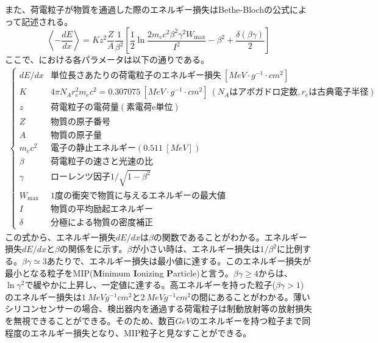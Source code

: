 また、荷電粒子が物質を通過した際のエネルギー損失はBethe-Blochの公式によって記述される。
\begin{equation}
  \label{eq:bethe}
  \left\langle -\frac{dE}{dx} \right\rangle = Kz^2\frac{Z}{A}\frac{1}{\beta^2}\left[ \frac{1}{2}\ln\frac{2m_e c^2 \beta^2 \gamma^2 W_\mathrm{max}}{I^2} -\beta^2 + \frac{\delta (\beta\gamma)}{2} \right]
\end{equation}
ここで、における各パラメータは以下の通りである。
\begin{align*}
  \begin{cases}
    dE/dx & \mathrm{単位長さあたりの荷電粒子のエネルギー損失}\ [\si{MeV\cdot g^{-1}\cdot cm^2}]\\
    K & 4\pi N_A r^2_e m_e c^2 = 0.307075\ [\si{MeV\cdot g^{-1}\cdot cm^2}]\ (N_A\mathrm{はアボガドロ定数}, r_e\mathrm{は古典電子半径})\\
    z & \mathrm{荷電粒子の電荷量(素電荷e単位)}\\
    Z & \mathrm{物質の原子番号}\\
    A & \mathrm{物質の原子量}\\
    m_e c^2 & \mathrm{電子の静止エネルギー}(0.511\ [\si{MeV}]) \\
    \beta & \mathrm{荷電粒子の速さと光速の比}\\
    \gamma & \mathrm{ローレンツ因子} 1/\sqrt{1-\beta^2} \\
    W_\mathrm{max} & \mathrm{1度の衝突で物質に与えるエネルギーの最大値} \\
    I & \mathrm{物質の平均励起エネルギー}\\
    \delta & \mathrm{分極による物質の密度補正}
　\end{cases}
\end{align*}
この式から、エネルギー損失$dE/dx$は$\beta$の関数であることがわかる。エネルギー損失$dE/dx$と$\beta$の関係をに示す。$\beta$が小さい時は、エネルギー損失は$1/\beta^2$に比例する。$\beta\gamma \simeq 3$あたりで、エネルギー損失は最小値に達する。このエネルギー損失が最小となる粒子をMIP(\textbf{M}inimum \textbf{I}onizing \textbf{P}article)と言う。$\beta\gamma\geq4$からは、$\ln\gamma^2$で緩やかに上昇し、一定値に達する。高エネルギーを持った粒子($\beta\gamma>1$)のエネルギー損失は$1\ \si{MeVg^{-1}cm^2}$と$2\ \si{MeVg^{-1}cm^2}$の間にあることがわかる。薄いシリコンセンサーの場合、検出器内を通過する荷電粒子は制動放射等の放射損失を無視できることができる。そのため、数百$\si{GeV}$のエネルギーを持つ粒子まで同程度のエネルギー損失となり、MIP粒子と見なすことができる。

